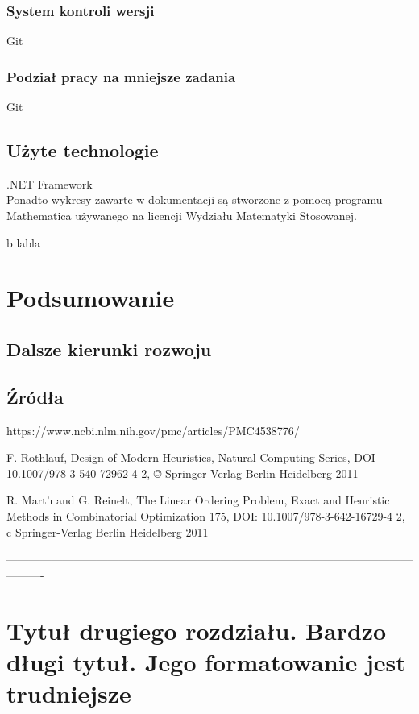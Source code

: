 \documentclass[twoside]{projektInzynierskiMS1}
\begin{document}
	\subsubsection{System kontroli wersji}
	Git
	\subsubsection{Podział pracy na mniejsze zadania}
	Git
	\subsection{Użyte technologie}
	.NET Framework \\
Ponadto wykresy zawarte w dokumentacji są stworzone z pomocą programu Mathematica używanego na licencji Wydziału Matematyki Stosowanej.

b labla
\section{Podsumowanie}
	\subsection{Dalsze kierunki rozwoju}
	\subsection{Źródła}
https://www.ncbi.nlm.nih.gov/pmc/articles/PMC4538776/

F. Rothlauf, Design of Modern Heuristics, Natural Computing Series,
DOI 10.1007/978-3-540-72962-4 2, © Springer-Verlag Berlin Heidelberg 2011

R. Mart'ı and G. Reinelt, The Linear Ordering Problem, Exact and Heuristic Methods
in Combinatorial Optimization 175, DOI: 10.1007/978-3-642-16729-4 2,
c Springer-Verlag Berlin Heidelberg 2011


----------------------------------------------------------------------------------------------------------------------
\section[Tytuł drugiego rozdziału. Bardzo długi \ldots]
        {Tytuł drugiego rozdziału. \newlineTekst Bardzo długi tytuł. \newlineTekst
          Jego \newlineSpis formatowanie jest trudniejsze}
\end{document}
